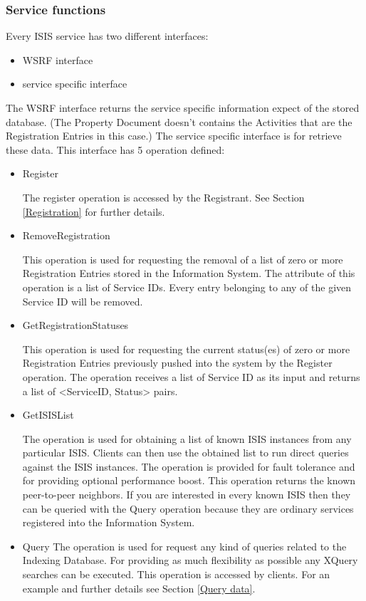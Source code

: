 \documentclass{article}                            %
\begin{document}
\subsubsection{Service functions}
\label{ISIS Service functions}
Every ISIS service has two different interfaces:
\begin{itemize}
  \item WSRF interface
  \item service specific interface
\end{itemize}
The WSRF interface returns the service specific information expect of the stored database. (The Property Document doesn't contains the Activities that are the Registration Entries in this case.) The service specific interface is for retrieve these data. This interface has 5 operation defined:
\begin{itemize}
  \item Register\par
  The register operation is accessed by the Registrant. See Section \ref{Registration} for further details.
  \item RemoveRegistration\par
  This operation is used for requesting the removal of a list of zero or more Registration Entries stored in the Information System. The attribute of this operation is a list of Service IDs. Every entry belonging to any of the given Service ID will be removed.
  \item GetRegistrationStatuses\par
  This operation is used for requesting the current status(es) of zero or more Registration Entries previously pushed into the system by the Register operation. The operation receives a list of Service ID as its input and returns a list of <ServiceID, Status> pairs.
  \item GetISISList\par
  The operation is used for obtaining a list of known ISIS instances from any particular ISIS. Clients can then use the obtained list to run direct queries against the ISIS instances.  The operation is provided for fault tolerance and for providing optional performance boost. This operation returns the known peer-to-peer neighbors. If you are interested in every known ISIS then they can be queried with the Query operation because they are ordinary services registered into the Information System.
  \item Query
  The operation is used for request any kind of queries related to the Indexing Database. For providing as much flexibility as possible any XQuery searches can be executed. This operation is accessed by clients. For an example and further details see Section \ref{Query data}. 
\end{itemize}
\end{document}
